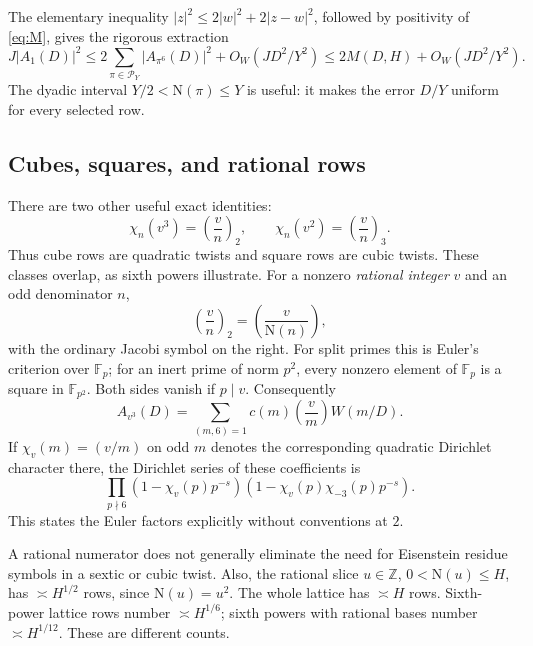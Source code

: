 \documentclass[11pt]{article}
\newcommand{\N}{\mathrm N}
\newcommand{\ch}{\chi_{-3}}
\numberwithin{equation}{section}
\begin{document}
The elementary inequality $|z|^2\le2|w|^2+2|z-w|^2$, followed by
positivity of \eqref{eq:M}, gives the rigorous extraction
\begin{equation}\label{eq:extract}
 J|A_1(D)|^2
 \le2\sum_{\pi\in\mathcal P_Y}|A_{\pi^6}(D)|^2
       +O_W(JD^2/Y^2)
 \le2M(D,H)+O_W(JD^2/Y^2).
\end{equation}
The dyadic interval $Y/2<\N(\pi)\le Y$ is useful: it makes the error
$D/Y$ uniform for every selected row.

\subsection{Cubes, squares, and rational rows}
There are two other useful exact identities:
\begin{equation}\label{eq:cubesquare}
 \chi_n(v^3)=\left(\frac vn\right)_2,\qquad
 \chi_n(v^2)=\left(\frac vn\right)_3.
\end{equation}
Thus cube rows are quadratic twists and square rows are cubic twists.
These classes overlap, as sixth powers illustrate.
For a nonzero \emph{rational integer} $v$ and an odd denominator $n$,
\begin{equation}\label{eq:rationalquad}
 \left(\frac vn\right)_2=\left(\frac v{\N(n)}\right),
\end{equation}
with the ordinary Jacobi symbol on the right. For split primes this is
Euler's criterion over $\mathbb F_p$; for an inert prime of norm $p^2$,
every nonzero element of $\mathbb F_p$ is a square in $\mathbb F_{p^2}$.
Both sides vanish if $p\mid v$. Consequently
\begin{equation}\label{eq:cuberational}
 A_{v^3}(D)=\sum_{(m,6)=1}c(m)\left(\frac vm\right)W(m/D).
\end{equation}
If $\chi_v(m)=(v/m)$ on odd $m$ denotes the corresponding quadratic
Dirichlet character there, the Dirichlet series of these coefficients is
\begin{equation}\label{eq:cubeeuler}
 \prod_{p\nmid6}(1-\chi_v(p)p^{-s})
                    (1-\chi_v(p)\ch(p)p^{-s}).
\end{equation}
This states the Euler factors explicitly without conventions at $2$.

A rational numerator does not generally eliminate the need for
Eisenstein residue symbols in a sextic or cubic twist. Also, the rational
slice $u\in\mathbb Z$, $0<\N(u)\le H$, has $\asymp H^{1/2}$ rows, since
$\N(u)=u^2$. The whole lattice has $\asymp H$ rows. Sixth-power lattice
rows number $\asymp H^{1/6}$; sixth powers with rational bases number
$\asymp H^{1/12}$. These are different counts.
\end{document}
